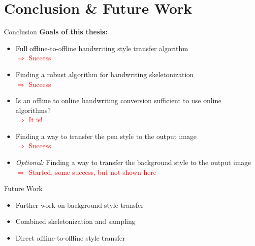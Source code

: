 \documentclass[aspectratio=169]{beamer}
\begin{document}
\section{Conclusion \& Future Work}




\begin{frame}{Conclusion}
\textbf{Goals of this thesis:}
\begin{itemize}
\item Full offline-to-offline handwriting style transfer algorithm\\
\textcolor{red}{\hspace{1em}$\Rightarrow$ Success}
\item Finding a robust algorithm for handwriting skeletonization\\
\textcolor{red}{\hspace{1em}$\Rightarrow$ Success}
\item Is an offline to online handwriting conversion sufficient to use online algorithms?\\
\textcolor{red}{\hspace{1em}$\Rightarrow$ It is!}
\item Finding a way to transfer the pen style to the output image\\
\textcolor{red}{\hspace{1em}$\Rightarrow$ Success}
\item \emph{Optional:} Finding a way to transfer the background style to the output image\\
\textcolor{red}{\hspace{1em}$\Rightarrow$ Started, some success, but not shown here}
\end{itemize}
\end{frame}



\begin{frame}{Future Work}
\begin{itemize}
\item Further work on background style transfer
\item Combined skeletonization and sampling
\item Direct offline-to-offline style transfer
\end{itemize}
\end{frame}
\end{document}
